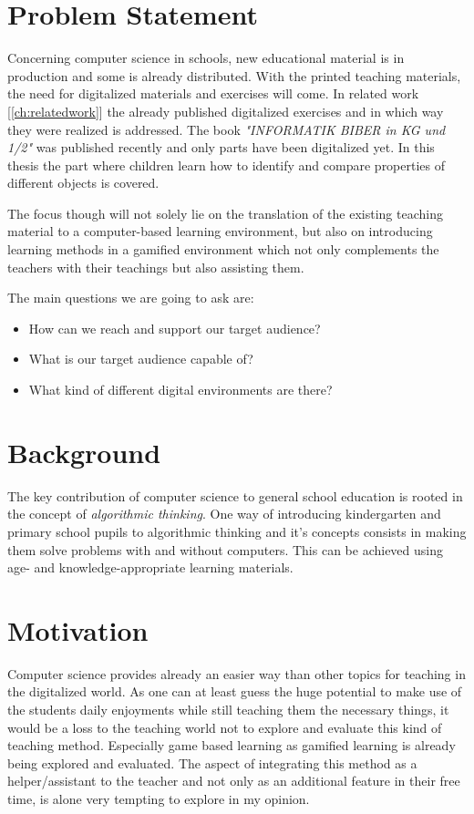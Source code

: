 \section{Problem Statement}\label{sec:problem-statement}
Concerning computer science in schools, new educational material is in production and some is already distributed.
With the printed teaching materials, the need for digitalized materials and exercises will come.
In related work [\ref{ch:relatedwork}] the already published digitalized exercises and
in which way they were realized is addressed.
The book \textit{"INFORMATIK BIBER in KG und 1/2"}\cite{ibkg12} was published recently and only parts have been digitalized yet.
In this thesis the part where children learn how to identify and compare properties of different objects is covered.

The focus though will not solely lie on the translation of the existing teaching material to a
computer-based learning environment, but also on introducing learning methods in a gamified environment which
not only complements the teachers with their teachings but also assisting them.

The main questions we are going to ask are:

\begin{itemize}
    \item How can we reach and support our target audience?
    \item What is our target audience capable of?
    \item What kind of different digital environments are there?
\end{itemize}

\section{Background}\label{sec:background}
The key contribution of computer science to general school education is rooted in the concept of
\textit{algorithmic thinking}\cite{HKKS17}.
One way of introducing kindergarten and primary school pupils to algorithmic thinking and
it's concepts consists in making them solve problems with and without computers.
This can be achieved using age- and knowledge-appropriate learning materials.

\section{Motivation}\label{sec:motivation}
Computer science provides already an easier way than other topics for teaching in the digitalized world.
As one can at least guess the huge potential to make use of the students daily enjoyments while still teaching
them the necessary things, it would be a loss to the teaching world not to explore and evaluate this kind of teaching
method. Especially game based learning as gamified learning is already being explored and evaluated.
The aspect of integrating this method as a helper/assistant to the teacher and not only as an additional feature in
their free time, is alone very tempting to explore in my opinion.

